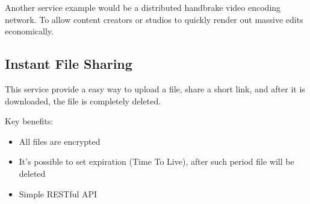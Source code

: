 Another service example would be a distributed handbrake video encoding network. To allow content creators or studios to quickly render out massive edits economically.

\subsection{Instant File Sharing}

This service provide a easy way to upload a file, share a short link, and after it is downloaded, the file is completely deleted.

Key benefits:

\begin{itemize}
    \item All files are encrypted
    \item It's possible to set expiration (Time To Live), after such period file will be deleted
    \item Simple RESTful API
\end{itemize}
